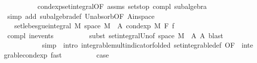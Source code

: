 \begin{isabellebody}
\ \ \ \ \ \ \ \ \isamarkupfalse%
\ cond{\isacharunderscore}{\kern0pt}exp{\isacharunderscore}{\kern0pt}set{\isacharunderscore}{\kern0pt}integral{\isacharbrackleft}{\kern0pt}OF\ assms{\isacharparenleft}{\kern0pt}{}{\isacharparenright}{\kern0pt}\ sets{\isachardot}{\kern0pt}top{\isacharbrackright}{\kern0pt}\ compl\ subalgebra\ \isamarkupfalse%
\ {\isacharparenleft}{\kern0pt}simp\ add{\isacharcolon}{\kern0pt}\ subalgebra{\isacharunderscore}{\kern0pt}def\ Un{\isacharunderscore}{\kern0pt}absorb{}{\isacharbrackleft}{\kern0pt}OF\ A{\isacharunderscore}{\kern0pt}in{\isacharunderscore}{\kern0pt}space{\isacharbrackright}{\kern0pt}{\isacharparenright}{\kern0pt}\isanewline
\ \ \ \ \ \ \isamarkupfalse%
\ \isamarkupfalse%
\ {\isachardoublequoteopen}{\isachardot}{\kern0pt}{\isachardot}{\kern0pt}{\isachardot}{\kern0pt}\ {\isacharequal}{\kern0pt}\ set{\isacharunderscore}{\kern0pt}lebesgue{\isacharunderscore}{\kern0pt}integral\ M\ {\isacharparenleft}{\kern0pt}space\ M\ {\isacharminus}{\kern0pt}\ A{\isacharparenright}{\kern0pt}\ {\isacharparenleft}{\kern0pt}cond{\isacharunderscore}{\kern0pt}exp\ M\ F\ f{\isacharparenright}{\kern0pt}{\isachardoublequoteclose}\isanewline
\ \ \ \ \ \ \ \ \isamarkupfalse%
\ compl{\isacharparenleft}{\kern0pt}{}{\isacharparenright}{\kern0pt}\ in{\isacharunderscore}{\kern0pt}events\isanewline
\ \ \ \ \ \ \ \ \isamarkupfalse%
\ {\isacharparenleft}{\kern0pt}subst\ set{\isacharunderscore}{\kern0pt}integral{\isacharunderscore}{\kern0pt}Un{\isacharbrackleft}{\kern0pt}of\ {\isachardoublequoteopen}space\ M\ {\isacharminus}{\kern0pt}\ A{\isachardoublequoteclose}\ A{\isacharbrackright}{\kern0pt}{\isacharcomma}{\kern0pt}\ blast{\isacharparenright}{\kern0pt}\isanewline
\ \ \ \ \ \ \ \ \ \ \ {\isacharparenleft}{\kern0pt}simp\ {\isacharbar}{\kern0pt}\ intro\ integrable{\isacharunderscore}{\kern0pt}mult{\isacharunderscore}{\kern0pt}indicator{\isacharbrackleft}{\kern0pt}folded\ set{\isacharunderscore}{\kern0pt}integrable{\isacharunderscore}{\kern0pt}def{\isacharcomma}{\kern0pt}\ OF\ {\isacharunderscore}{\kern0pt}\ integrable{\isacharunderscore}{\kern0pt}cond{\isacharunderscore}{\kern0pt}exp{\isacharbrackright}{\kern0pt}{\isacharcomma}{\kern0pt}\ fast{\isacharparenright}{\kern0pt}{\isacharplus}{\kern0pt}\isanewline
\ \ \ \ \ \ \isamarkupfalse%
\ \isamarkupfalse%
\ {\isacharquery}{\kern0pt}case\ \isacommand{{\isachardot}{\kern0pt}}\isamarkupfalse%
\isanewline
\ \ \ \ \isamarkupfalse%

\end{isabellebody}
